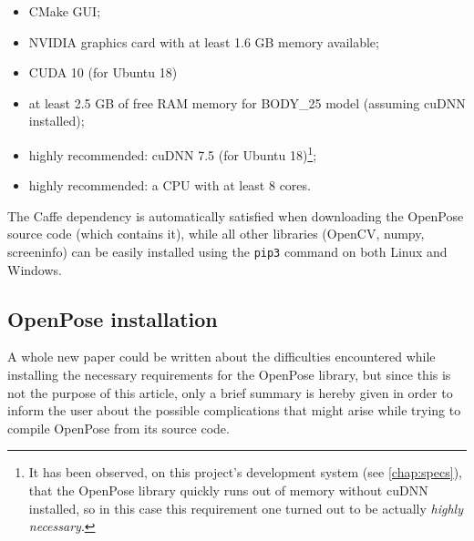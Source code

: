 \documentclass[12pt]{article}
\begin{document}
\begin{itemize}
    \item CMake GUI\cite{cmake};
    \item NVIDIA graphics card with at least 1.6 GB memory available;
    \item CUDA 10 (for Ubuntu 18)\cite{cuda}
    \item at least 2.5 GB of free RAM memory for BODY\_25 model (assuming cuDNN installed);
    \item highly recommended: cuDNN 7.5 (for Ubuntu 18)\footnote{It has been observed, on this project's development system (see \ref{chap:specs}), that the OpenPose library quickly runs out of memory without cuDNN installed, so in this case this requirement one turned out to be actually \textit{highly necessary}.};
    \item highly recommended: a CPU with at least 8 cores.
\end{itemize}

The Caffe dependency is automatically satisfied when downloading the OpenPose source code (which contains it), while all other libraries (OpenCV, numpy\cite{numpy}, screeninfo) can be easily installed using the \lstinline{pip3} command on both Linux and Windows.


\subsection{OpenPose installation}
\label{chap:install}
A whole new paper could be written about the difficulties encountered while installing the necessary requirements for the OpenPose library, but since this is not the purpose of this article, only a brief summary is hereby given in order to inform the user about the possible complications that might arise while trying to compile OpenPose from its source code\cite{opinstall}\cite{opinstallunoff}.
\end{document}
